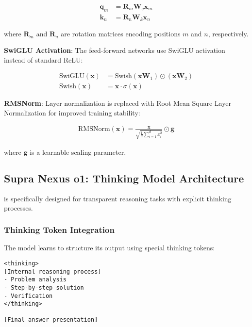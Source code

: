 \begin{align}
\mathbf{q}_m &= \mathbf{R}_m \mathbf{W}_q \mathbf{x}_m \\
\mathbf{k}_n &= \mathbf{R}_n \mathbf{W}_k \mathbf{x}_n
\end{align}

where $\mathbf{R}_m$ and $\mathbf{R}_n$ are rotation matrices encoding positions $m$ and $n$, respectively.

\textbf{SwiGLU Activation}: The feed-forward networks use SwiGLU activation instead of standard ReLU:

\begin{align}
\text{SwiGLU}(\mathbf{x}) &= \text{Swish}(\mathbf{x} \mathbf{W}_1) \odot (\mathbf{x} \mathbf{W}_2) \\
\text{Swish}(\mathbf{x}) &= \mathbf{x} \cdot \sigma(\mathbf{x})
\end{align}

\textbf{RMSNorm}: Layer normalization is replaced with Root Mean Square Layer Normalization for improved training stability:

\begin{align}
\text{RMSNorm}(\mathbf{x}) = \frac{\mathbf{x}}{\sqrt{\frac{1}{d} \sum_{i=1}^{d} x_i^2}} \odot \mathbf{g}
\end{align}

where $\mathbf{g}$ is a learnable scaling parameter.

\subsection{Supra Nexus o1: Thinking Model Architecture}

\supra{} is specifically designed for transparent reasoning tasks with explicit thinking processes.

\subsubsection{Thinking Token Integration}

The model learns to structure its output using special thinking tokens:

\begin{lstlisting}[caption=Thinking token structure,label=lst:thinking-tokens]
<thinking>
[Internal reasoning process]
- Problem analysis
- Step-by-step solution
- Verification
</thinking>

[Final answer presentation]
\end{lstlisting}

